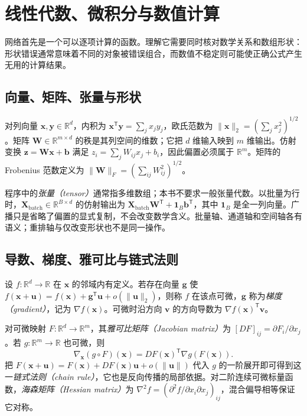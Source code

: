 \setcounter{chapter}{1} %
\chapter{线性代数、微积分与数值计算}
\label{chap:dl-mathematics}
网络首先是一个可以逐项计算的函数。理解它需要同时核对数学关系和数组形状：形状错误通常意味着不同的对象被错误组合，而数值不稳定则可能使正确公式产生无用的计算结果。

\section{向量、矩阵、张量与形状}
对列向量 $\mathbf x,\mathbf y\in\mathbb R^d$，内积为 $\mathbf x^\mathsf T\mathbf y=\sum_jx_jy_j$，欧氏范数为 $\|\mathbf x\|_2=(\sum_jx_j^2)^{1/2}$。矩阵 $\mathbf W\in\mathbb R^{m\times d}$ 的秩是其列空间的维数；它把 $d$ 维输入映到 $m$ 维输出。仿射变换 $\mathbf z=\mathbf W\mathbf x+\mathbf b$ 满足 $z_i=\sum_jW_{ij}x_j+b_i$，因此偏置必须属于 $\mathbb R^m$。矩阵的 Frobenius 范数定义为 $\|\mathbf W\|_F=(\sum_{ij}W_{ij}^2)^{1/2}$。

程序中的\emph{张量（tensor）}通常指多维数组；本书不要求一般张量代数。以批量为行时，$\mathbf X_{\mathrm{batch}}\in\mathbb R^{B\times d}$ 的仿射输出为 $\mathbf X_{\mathrm{batch}}\mathbf W^\mathsf T+\mathbf1_B\mathbf b^\mathsf T$，其中 $\mathbf1_B$ 是全一列向量。广播只是省略了偏置的显式复制，不会改变数学含义。批量轴、通道轴和空间轴各有语义；重排轴与仅改变形状也不是同一操作。

\section{导数、梯度、雅可比与链式法则}
\begin{definition}[微分与梯度]
设 $f:\mathbb R^d\to\mathbb R$ 在 $\mathbf x$ 的邻域内有定义。若存在向量 $\mathbf g$ 使 $f(\mathbf x+\mathbf u)=f(\mathbf x)+\mathbf g^\mathsf T\mathbf u+o(\|\mathbf u\|_2)$，则称 $f$ 在该点可微，$\mathbf g$ 称为\emph{梯度（gradient）}，记为 $\nabla f(\mathbf x)$。可微时沿方向 $\mathbf v$ 的方向导数为 $\nabla f(\mathbf x)^\mathsf T\mathbf v$。
\end{definition}
对可微映射 $F:\mathbb R^d\to\mathbb R^m$，其\emph{雅可比矩阵（Jacobian matrix）}为 $[DF]_{ij}=\partial F_i/\partial x_j$。若 $g:\mathbb R^m\to\mathbb R$ 也可微，则
\begin{equation}
\nabla_{\mathbf x}(g\circ F)(\mathbf x)=DF(\mathbf x)^\mathsf T\nabla g(F(\mathbf x)).
\label{eq:dl-chain-rule}
\end{equation}
把 $F(\mathbf x+\mathbf u)=F(\mathbf x)+DF(\mathbf x)\mathbf u+o(\|\mathbf u\|)$ 代入 $g$ 的一阶展开即可得到这一\emph{链式法则（chain rule）}，它也是反向传播的局部依据。对二阶连续可微标量函数，\emph{海森矩阵（Hessian matrix）}为 $\nabla^2f=(\partial^2f/\partial x_i\partial x_j)_{ij}$，混合偏导相等保证它对称。

